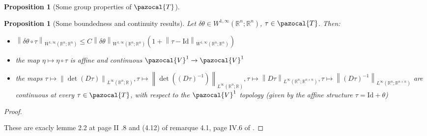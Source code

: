 \documentclass[english,a4paper,9pt,oneside]{scrbook}	%
\theoremstyle{break}
\newtheorem{prop}[equation]{Proposition}
\newenvironment{mproof}[1][\proofname]{%
  \begin{proof}[#1]$ $\par\nobreak\ignorespaces
}{%
  \end{proof}
}
\renewcommand*{\proofname}{Proof}
\theoremstyle{remark}
\newcommand{\mR}{\mathbb{R}}
\newcommand{\cV}{\pazocal{V}}
\newcommand{\ds}{\displaystyle}
\newcommand{\norm}[1]{\left\lVert#1\right\rVert}
\newcommand{\cT}{\pazocal{T}}
\newcommand{\id}{\text{Id}}
\newcommand{\te}{\theta}
\newcommand{\Te}{\Theta}
\begin{document}
\begin{appendices}
\begin{prop}[Some group properties of $\cT$]
\end{prop}
%
%
%
%
%
%


\begin{prop}[Some boundedness and continuity results]
\label{prop:22416}
Let $\delta \te \in W^{1,\infty}(\mR^n;\mR^n)$, $\tau \in \cT$. Then:
\begin{itemize}
\item $\ds \norm{\delta \te \circ \tau}_{ W^{1,\infty}(\mR^n;\mR^n)}\leq  C\norm{\delta \te}_{W^{1,\infty}(\mR^n;\mR^n)} (1+\norm{\tau -\id}_{ W^{1,\infty}(\mR^n;\mR^n)})$
\item the map $\eta \mapsto \eta \circ \tau$ is affine and continuous $\cV^1\rightarrow \cV^1$
\item the maps $\tau \mapsto \norm{\det(D\tau)}_{L^\infty(\mR^n;\mR)}, \tau \mapsto  \norm{\det((D\tau)^{-1})}_{L^\infty(\mR^n;\mR)},\tau  \mapsto \norm{D\tau}_{L^\infty(\mR^n;\mR^{n\times n})}, \tau \mapsto \norm{(D\tau)^{-1}}_{L^\infty(\mR^n;\mR^{n\times n})}$ are continuous at every $\tau \in \cT$, with respect to the $\cV^1$ topology (given by the affine structure $\tau = \id + \te$)
\end{itemize}
\end{prop}
\begin{mproof}
These are exacly lemme 2.2 at page II .8 and (4.12) of remarque 4.1, page IV.6 of \cite{murat}. 
\end{mproof}


\end{appendices}
\end{document}
